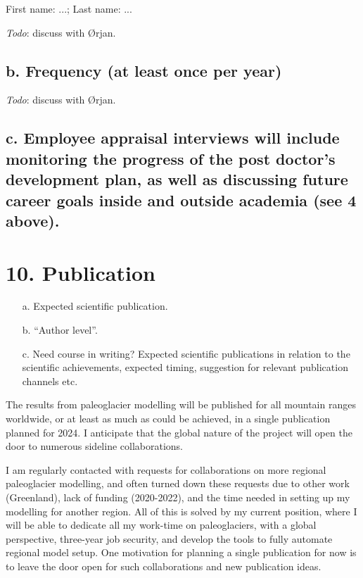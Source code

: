 \documentclass{article}
\renewcommand{\cvdoubleitem}[4]{#1: #2; #3: #4}
\newcommand{\names}[2]{\cvdoubleitem{First name}{#1}{Last name}{#2}}
\newcommand{\guideline}[1]{{\color{color2}\itshape{#1}}}
\newcommand{\todo}[1]{{\color{red}\emph{Todo}: #1}}
\begin{document}
    \names{...}{...}

    \todo{discuss with Ørjan.}

\subsection{b. Frequency (at least once per year)}

    \todo{discuss with Ørjan.}

\subsection{c. Employee appraisal interviews will include monitoring the progress of the post doctor’s development plan, as well as discussing future career goals inside and outside academia (see 4 above).}


\section{10. Publication}

    \guideline{
        \begin{itemize}
          \item[a.] Expected scientific publication.
          \item[b.] ``Author level''.
          \item[c.] Need course in writing? Expected scientific publications in
            relation to the scientific achievements, expected timing,
            suggestion for relevant publication channels etc.
        \end{itemize}}

    The results from paleoglacier modelling will be published for all mountain
    ranges worldwide, or at least as much as could be achieved, in a single
    publication planned for 2024. I anticipate that the global nature of the
    project will open the door to numerous sideline collaborations.

    I am regularly contacted with requests for collaborations on more regional
    paleoglacier modelling, and often turned down these requests due to other
    work (Greenland), lack of funding (2020-2022), and the time needed in
    setting up my modelling for another region. All of this is solved by my
    current position, where I will be able to dedicate all my work-time on
    paleoglaciers, with a global perspective, three-year job security, and
    develop the tools to fully automate regional model setup. One motivation
    for planning a single publication for now is to leave the door open for
    such collaborations and new publication ideas.
\end{document}
